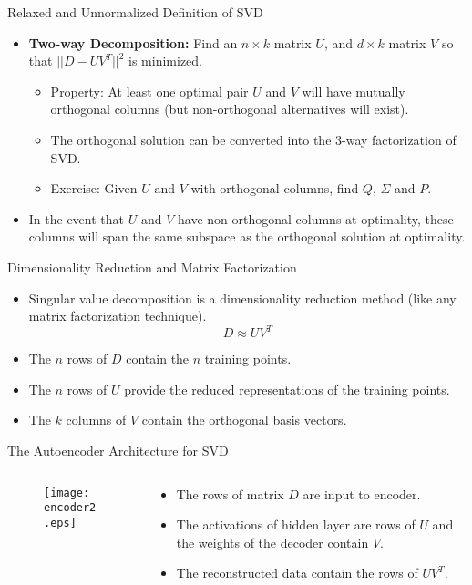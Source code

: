 \begin{frame}{Relaxed and Unnormalized Definition of  SVD}
\begin{itemize}
\item {\bf Two-way Decomposition:} Find an $n \times k$ matrix $U$,  and $d \times k$ matrix $V$ so that $||D
- U V^T||^2$ is minimized.
\begin{itemize}
\item Property: At least one optimal pair $U$ and $V$ will have
mutually orthogonal columns (but non-orthogonal alternatives will
exist).
\item The orthogonal solution can be converted into the 3-way
factorization of SVD.
\item Exercise: Given $U$ and $V$ with orthogonal columns, find $Q$, $\Sigma$ and $P$.
\end{itemize}
\item In the event that $U$ and $V$ have non-orthogonal columns at optimality,
these columns will span the same subspace as the orthogonal solution
at optimality.
\end{itemize}
\end{frame}


\begin{frame}{Dimensionality Reduction and Matrix Factorization}
\begin{itemize}
\item Singular value decomposition is a dimensionality reduction
method (like any matrix factorization technique).
\begin{equation*}
D \approx U V^T
\end{equation*}
\item The $n$ rows of $D$ contain the $n$ training points.
\item The $n$ rows of $U$  provide the reduced representations of
the training points.
\item The $k$ columns of $V$ contain the orthogonal basis vectors.
\end{itemize}
\end{frame}


\begin{frame}{The Autoencoder Architecture for SVD}
\begin{columns}
\begin{column}{.5\textwidth}
\begin{figure}[!]
\centering
\texttt{[image: encoder2.eps]}
\end{figure}
\end{column}
\begin{column}{.5\textwidth}
\begin{itemize}
\item The rows of matrix $D$ are input to encoder.
\item The activations of hidden layer are rows of $U$ and the
weights of the decoder contain $V$.
\item The reconstructed data contain the rows of $UV^T$.
\end{itemize}
\end{column}
\end{columns}
\end{frame}


